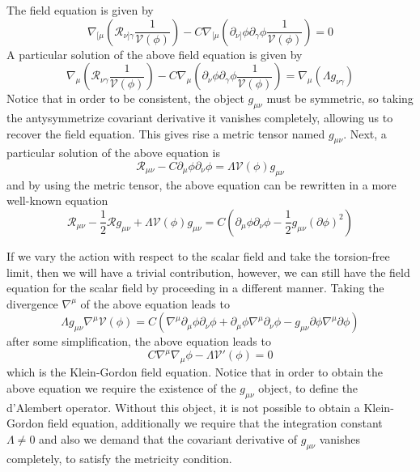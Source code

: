 \documentclass[10pt,a4paper]{article}
\begin{document}
The field equation is given by
\begin{equation}
  \nabla_{[\mu}\left(\mathcal{R}_{\nu]\gamma}\frac{1}{\mathcal{V}(\phi)}\right) 
  - C \nabla_{[\mu}\left(\partial_{\nu]} \phi \partial_\gamma \phi \frac{1}{\mathcal{V}(\phi)}\right) = 0
\end{equation}
A particular solution of the above field equation is given by
\begin{equation}
  \nabla_{\mu}\left(\mathcal{R}_{\nu\gamma}\frac{1}{\mathcal{V}(\phi)}\right) 
  - C \nabla_{\mu}\left(\partial_{\nu} \phi \partial_\gamma \phi \frac{1}{\mathcal{V}(\phi)}\right) = \nabla_\mu \left(\Lambda g_{\nu\gamma}\right)
\end{equation}
Notice that in order to be consistent, the object $g_{\mu\nu}$ must be symmetric, so taking the antysymmetrize covariant derivative it vanishes completely, 
allowing us to recover the field equation. This gives rise a metric tensor named $g_{\mu\nu}$. Next, a particular solution of the above equation is
\begin{equation}
  \mathcal{R}_{\mu\nu} - C\partial_\mu \phi \partial_\nu \phi = \Lambda \mathcal{V}(\phi) g_{\mu\nu}
\end{equation}
and by using the metric tensor, the above equation can be rewritten in a more well-known equation 
\begin{equation}
  \mathcal{R}_{\mu\nu} - \frac{1}{2}\mathcal{R}g_{\mu\nu} + \Lambda \mathcal{V}(\phi) g_{\mu\nu} = 
  C\left(\partial_\mu \phi \partial_\nu \phi - \frac{1}{2}g_{\mu\nu} (\partial \phi)^2\right)
\end{equation}

If we vary the action with respect to the scalar field and take the torsion-free limit, then we will have a trivial contribution, however, we can still
have the field equation for the scalar field by proceeding in a different manner. Taking the divergence $\nabla^\mu$ of the above equation leads to
\begin{equation}
  \Lambda g_{\mu\nu}\nabla^{\mu}\mathcal{V}(\phi) =C \left(\nabla^{\mu}\partial_\mu \phi \partial_\nu \phi + \partial_\mu \phi \nabla^{\mu}\partial_\nu \phi
  - g_{\mu\nu} \partial \phi \nabla^{\mu}\partial \phi \right)
\end{equation}
after some simplification, the above equation leads to
\begin{equation}
  C \nabla^\mu \nabla_\mu \phi - \Lambda \mathcal{V}'(\phi) = 0
\end{equation}
which is the Klein-Gordon field equation. Notice that in order to obtain the above equation we require the existence of the $g_{\mu\nu}$ object, to define the 
d'Alembert operator. Without this object, it is not possible to obtain a Klein-Gordon field equation, additionally we require that the integration 
constant $\Lambda \neq 0$ and also we demand that the covariant derivative of $g_{\mu\nu}$ vanishes
completely, to satisfy the metricity condition.
\end{document}

